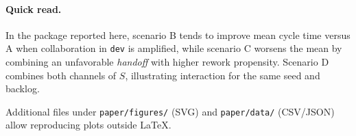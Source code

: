 \paragraph{Quick read.}
In the package reported here, scenario B tends to improve mean cycle time versus A when collaboration in \texttt{dev} is amplified, while scenario C worsens the mean by combining an unfavorable \emph{handoff} with higher rework propensity. Scenario D combines both channels of $S$, illustrating interaction for the same seed and backlog.

Additional files under \texttt{paper/figures/} (SVG) and \texttt{paper/data/} (CSV/JSON) allow reproducing plots outside \LaTeX{}.
